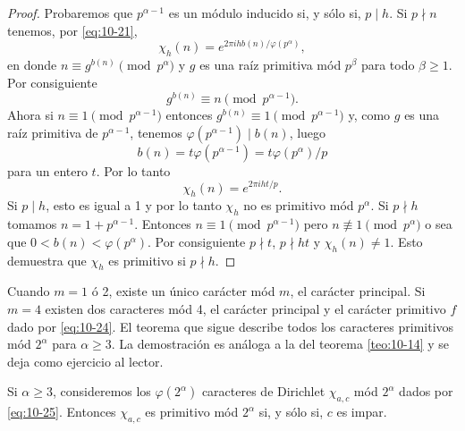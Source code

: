 \documentclass[12pt,a4paper]{book}
\begin{document}
    \begin{proof}
        Probaremos que $p^{\alpha-1}$ es un módulo inducido si, y sólo si, $p\mid h$. Si
        $p\nmid n$ tenemos, por \eqref{eq:10-21},
        \begin{equation*}
            \chi_{h}(n)=e^{2\pi ihb(n)/\varphi(p^{\alpha})},
        \end{equation*}
        en donde $n\equiv g^{b(n)}\pmod{p^{\alpha}}$ y $g$ es una raíz primitiva mód
        $p^{\beta}$ para todo $\beta\geq1$. Por consiguiente
        \begin{equation*}
            g^{b(n)}\equiv n\pmod{p^{\alpha-1}}.
        \end{equation*}
        Ahora si $n\equiv1\pmod{p^{\alpha-1}}$ entonces $g^{b(n)}\equiv1\pmod{p^{\alpha-1}}$
        y, como $g$ es una raíz primitiva de $p^{\alpha-1}$, tenemos
        $\varphi(p^{\alpha-1})\mid b(n)$, luego
        \begin{equation*}
            b(n)=t\varphi(p^{\alpha-1})=t\varphi(p^{\alpha})/p
        \end{equation*}
        para un entero $t$. Por lo tanto
        \begin{equation*}
            \chi_{h}(n)=e^{2\pi iht/p}.
        \end{equation*}
        Si $p\mid h$, esto es igual a 1 y por lo tanto $\chi_{h}$ no es primitivo mód
        $p^{\alpha}$. Si $p\nmid h$ tomamos $n=1+p^{\alpha-1}$. Entonces
        $n\equiv1\pmod{p^{\alpha-1}}$ pero $n\not\equiv1\pmod{p^{\alpha}}$ o sea que
        $0<b(n)<\varphi(p^{\alpha})$. Por consiguiente $p\nmid t$, $p\nmid ht$ y
        $\chi_{h}(n)\neq1$. Esto demuestra que $\chi_{h}$ es primitivo si $p\nmid h$.
    \end{proof}

    Cuando $m=1$ ó 2, existe un único carácter mód $m$, el carácter principal. Si $m=4$
    existen dos caracteres mód 4, el carácter principal y el carácter primitivo $f$ dado por
    \eqref{eq:10-24}. El teorema que sigue describe todos los caracteres primitivos mód
    $2^{\alpha}$ para $\alpha\geq3$. La demostración es análoga a la del teorema
    \ref{teo:10-14} y se deja como ejercicio al lector.

    \begin{teorema}\label{teo:10-15}
        Si $\alpha\geq3$, consideremos los $\varphi(2^{\alpha})$ caracteres de Dirichlet
        $\chi_{a,c}$ mód $2^{\alpha}$ dados por \eqref{eq:10-25}. Entonces $\chi_{a,c}$ es
        primitivo mód $2^{\alpha}$ si, y sólo si, $c$ es impar.
    \end{teorema}
\end{document}
